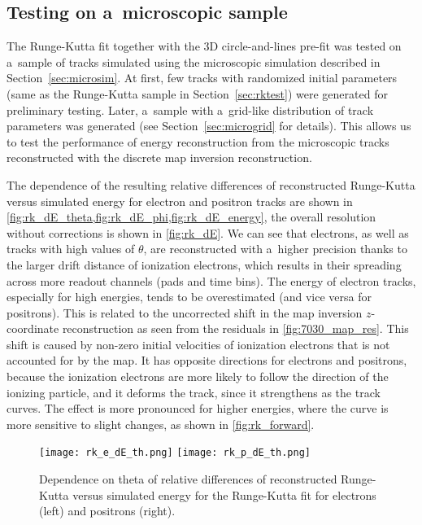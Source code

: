		
		\subsection{Testing on a~microscopic sample}
			The Runge-Kutta fit together with the 3D circle-and-lines pre-fit was tested on a~sample of tracks simulated using the microscopic simulation described in Section~\ref{sec:microsim}. At first, few tracks with randomized initial parameters (same as the Runge-Kutta sample in Section~\ref{sec:rktest}) were generated for preliminary testing. Later, a~sample with a~grid-like distribution of track parameters was generated (see Section~\ref{sec:microgrid} for details). This allows us to test the performance of energy reconstruction from the microscopic tracks reconstructed with the discrete map inversion reconstruction.
			
			The dependence of the resulting relative differences of reconstructed Runge-Kutta versus simulated energy for electron and positron tracks are shown in \cref{fig:rk_dE_theta,fig:rk_dE_phi,fig:rk_dE_energy}, the overall resolution without corrections is shown in \cref{fig:rk_dE}. We can see that electrons, as well as tracks with high values of $\theta$, are reconstructed with a~higher precision thanks to the larger drift distance of ionization electrons, which results in their spreading across more readout channels (pads and time bins). The energy of electron tracks, especially for high energies, tends to be overestimated (and vice versa for positrons). This is related to the uncorrected shift in the map inversion $z$\nobreakdash-coordinate reconstruction as seen from the residuals in \cref{fig:7030_map_res}. This shift is caused by non-zero initial velocities of ionization electrons that is not accounted for by the map. It has opposite directions for electrons and positrons, because the ionization electrons are more likely to follow the direction of the ionizing particle, and it deforms the track, since it strengthens as the track curves. The effect is more pronounced for higher energies, where the curve is more sensitive to slight changes, as shown in \cref{fig:rk_forward}.

			\begin{figure}
				\centering
				\texttt{[image: rk\_e\_dE\_th.png]}
				\hfill
				\texttt{[image: rk\_p\_dE\_th.png]}
				\caption{Dependence on theta of relative differences of reconstructed Runge-Kutta versus simulated energy for the Runge-Kutta fit for electrons (left) and positrons (right).}
				\label{fig:rk_dE_theta}
			\end{figure}


